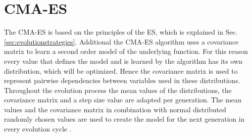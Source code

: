 
\section{CMA-ES}
\label{sec:cma-es}

The \acf{CMA-ES} is based on the principles of the \ac{ES}, which is explained in Sec. \ref{sec:evolutionstrategies}.
Additional the \ac{CMA-ES} algorithm uses a covariance matrix to learn a second order model of the underlying function.
For this reason every value that defines the model and is learned by the algorithm has its own distribution, which will be optimized.
Hence the covariance matrix is used to represent pairwise dependencies between variables used in these distributions.
Throughout the evolution process the mean values of the distributions, the covariance matrix and a step size value are adapted per generation.
The mean values and the covariance matrix in combination with normal distributed randomly chosen values are used to create the model for the next generation in every evolution cycle \cite{2017CMA-ES}.

